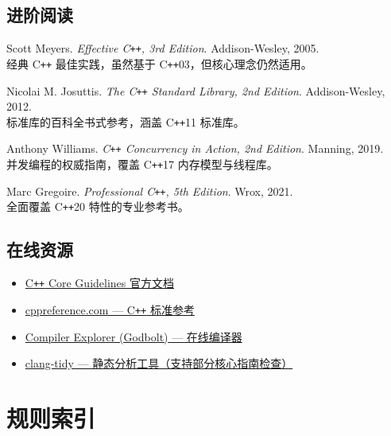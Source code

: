 \documentclass[12pt,a4paper,fontset=fandol]{ctexbook}
\begin{document}
\section*{进阶阅读}

\begin{enumerate}[label=\textbf{[\arabic*]}, start=5]
  \item Scott Meyers. \textit{Effective C\texttt{++}, 3rd Edition}. Addison-Wesley, 2005.\\
  经典 C\texttt{++} 最佳实践，虽然基于 C\texttt{++}03，但核心理念仍然适用。

  \item Nicolai M. Josuttis. \textit{The C\texttt{++} Standard Library, 2nd Edition}. Addison-Wesley, 2012.\\
  标准库的百科全书式参考，涵盖 C\texttt{++}11 标准库。

  \item Anthony Williams. \textit{C\texttt{++} Concurrency in Action, 2nd Edition}. Manning, 2019.\\
  并发编程的权威指南，覆盖 C\texttt{++}17 内存模型与线程库。

  \item Marc Gregoire. \textit{Professional C\texttt{++}, 5th Edition}. Wrox, 2021.\\
  全面覆盖 C\texttt{++}20 特性的专业参考书。
\end{enumerate}

\section*{在线资源}

\begin{itemize}
  \item \href{https://isocpp.github.io/CppCoreGuidelines/}{C\texttt{++} Core Guidelines 官方文档}
  \item \href{https://en.cppreference.com/}{cppreference.com --- C\texttt{++} 标准参考}
  \item \href{https://godbolt.org/}{Compiler Explorer (Godbolt) --- 在线编译器}
  \item \href{https://clang.llvm.org/extra/clang-tidy/}{clang-tidy --- 静态分析工具（支持部分核心指南检查）}
\end{itemize}

\chapter{规则索引}
\end{document}
